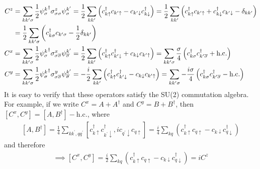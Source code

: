 \documentclass[12pt,twoside]{article}
\numberwithin{equation}{section}
\begin{document}
\begin{equation}\begin{aligned}
	C^z 
	&= \sum_{kk^\prime\sigma}\frac{1}{2} {\psi^k_\sigma}^\dagger \sigma^z_{\sigma\sigma} \psi^{k^\prime}_\sigma = \frac{1}{2}\sum_{kk^\prime}\left({c^\dagger_{k\uparrow}c_{k^\prime \uparrow} - c_{k^\prime\downarrow}c^\dagger_{k \downarrow}}\right) = \frac{1}{2}\sum_{kk^\prime}\left(c^\dagger_{k\uparrow}c_{k^\prime \uparrow} + c^\dagger_{k\downarrow}c_{k^\prime \downarrow} - \delta_{kk^\prime}\right)\\
	&= \frac{1}{2}\sum_{kk^\prime\sigma}\left(c^\dagger_{k\sigma}c_{k^\prime \sigma} - \frac{1}{2}\delta_{kk^\prime}\right)\label{diagonalCz}\\
	C^x 
	&= \sum_{kk^\prime\sigma}\frac{1}{2} {\psi^k_\sigma}^\dagger \sigma^x_{\sigma\overline\sigma} \psi^{k^\prime}_{\overline\sigma} = \frac{1}{2}\sum_{kk^\prime}\left( c^\dagger_{k\uparrow}c^\dagger_{k^\prime \downarrow} + c_{k\downarrow}c_{k^\prime \uparrow} \right) = \sum_{kk^\prime\sigma} \frac{\sigma}{4}\left( c^\dagger_{k\sigma}c^\dagger_{k^\prime\overline\sigma} + \text{h.c.} \right) \\
	C^y 
	&= \sum_{kk^\prime\sigma}\frac{1}{2} {\psi^k_\sigma}^\dagger \sigma^y_{\sigma\overline\sigma} \psi^{k^\prime}_{\overline\sigma} = - \frac{i}{2}\sum_{kk^\prime}\left( c^\dagger_{k\uparrow}c^\dagger_{k^\prime \downarrow} - c_{k\downarrow}c_{k^\prime \uparrow} \right) = \sum_{kk^\prime\sigma} - \frac{i\sigma}{4}\left( c^\dagger_{k\sigma}c^\dagger_{k^\prime\overline\sigma} - \text{h.c.} \right)\\
\end{aligned}\end{equation}
It is easy to verify that these operators satisfy the SU(2) commutation algebra. For example, if we write \(C^x = A + A^\dagger\) and \(C^y = B + B^\dagger\), then \(\left[ C^x, C^y \right] = \left[ A, B^\dagger \right] - \text{h.c.}\), where
\begin{equation}\begin{aligned}
	\left[ A, B^\dagger \right] = \frac{1}{4}\sum_{kk^\prime,qq^\prime}\left[ c^\dagger_{k\uparrow}c^\dagger_{k^\prime \downarrow}, i c_{q^\prime \downarrow}c_{q \uparrow} \right] = \frac{i}{4}\sum_{kq}\left(c^\dagger_{k\uparrow}c_{q \uparrow} - c_{k \downarrow}c^\dagger_{q \downarrow}\right)
\end{aligned}\end{equation}
and therefore
\begin{equation}\begin{aligned}
	\implies \left[ C^x, C^y \right] = \frac{i}{2}\sum_{kq}\left(c^\dagger_{k\uparrow}c_{q \uparrow} - c_{k \downarrow}c^\dagger_{q \downarrow}\right) = i C^z
\end{aligned}\end{equation}
\end{document}
